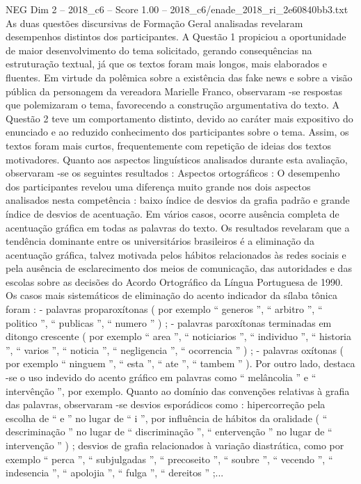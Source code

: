 \begin{textsample}{NEG Dim 2 – 2018\_c6 – Score 1.00 – 2018\_c6/enade\_2018\_ri\_2e60840bb3.txt}
As duas questões discursivas de Formação Geral analisadas revelaram desempenhos distintos dos participantes.
A Questão 1 propiciou a oportunidade de maior desenvolvimento do tema solicitado, gerando consequências na estruturação textual, já que os textos foram mais longos, mais elaborados e fluentes.
Em virtude da polêmica sobre a existência das fake news e sobre a visão pública da personagem da vereadora Marielle Franco, observaram -se respostas que polemizaram o tema, favorecendo a construção argumentativa do texto.
A Questão 2 teve um comportamento distinto, devido ao caráter mais expositivo do enunciado e ao reduzido conhecimento dos participantes sobre o tema.
Assim, os textos foram mais curtos, frequentemente com repetição de ideias dos textos motivadores.
Quanto aos aspectos linguísticos analisados durante esta avaliação, observaram -se os seguintes resultados : Aspectos ortográficos : O desempenho dos participantes revelou uma diferença muito grande nos dois aspectos analisados nesta competência : baixo índice de desvios da grafia padrão e grande índice de desvios de acentuação.
Em vários casos, ocorre ausência completa de acentuação gráfica em todas as palavras do texto.
Os resultados revelaram que a tendência dominante entre os universitários brasileiros é a eliminação da acentuação gráfica, talvez motivada pelos hábitos relacionados às redes sociais e pela ausência de esclarecimento dos meios de comunicação, das autoridades e das escolas sobre as decisões do Acordo Ortográfico da Língua Portuguesa de 1990.
Os casos mais sistemáticos de eliminação do acento indicador da sílaba tônica foram : - palavras proparoxítonas ( por exemplo “ generos ”, “ arbitro ”, “ politico ”, “ publicas ”, “ numero ” ) ; - palavras paroxítonas terminadas em ditongo crescente ( por exemplo “ area ”, “ noticiarios ”, “ individuo ”, “ historia ”, “ varios ”, “ noticia ”, “ negligencia ”, “ ocorrencia ” ) ; - palavras oxítonas ( por exemplo “ ninguem ”, “ esta ”, “ ate ”, “ tambem ” ).
Por outro lado, destaca -se o uso indevido do acento gráfico em palavras como “ melâncolia ” e “ intervênção ”, por exemplo.
Quanto ao domínio das convenções relativas à grafia das palavras, observaram -se desvios esporádicos como : hipercorreção pela escolha de “ e ” no lugar de “ i ”, por influência de hábitos da oralidade ( “ descriminação ” no lugar de “ discriminação ”, “ entervenção ” no lugar de “ intervenção ” ) ; desvios de grafia relacionados à variação diastrática, como por exemplo “ perca ”, “ subjulgadas ”, “ precoseito ”, “ soubre ”, “ vecendo ”, “ indesencia ”, “ apolojia ”, “ fulga ”, “ dereitos ” ;...

\end{textsample}

